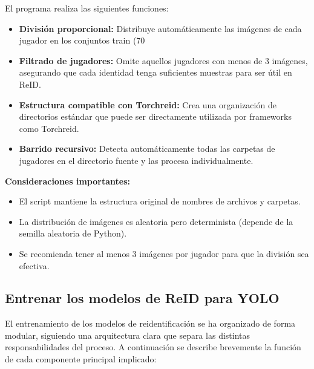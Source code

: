 \documentclass[12pt, a4paper, twoside]{article}
\begin{document}
	El programa realiza las siguientes funciones:
	
	\begin{itemize}
		\item \textbf{División proporcional:} Distribuye automáticamente las imágenes de cada jugador en los conjuntos train (70%
		\item \textbf{Filtrado de jugadores:} Omite aquellos jugadores con menos de 3 imágenes, asegurando que cada identidad tenga suficientes muestras para ser útil en ReID.
		\item \textbf{Estructura compatible con Torchreid:} Crea una organización de directorios estándar que puede ser directamente utilizada por frameworks como Torchreid.
		\item \textbf{Barrido recursivo:} Detecta automáticamente todas las carpetas de jugadores en el directorio fuente y las procesa individualmente.
	\end{itemize}
	
	\textbf{Consideraciones importantes:}
	\begin{itemize}
		\item El script mantiene la estructura original de nombres de archivos y carpetas.
		\item La distribución de imágenes es aleatoria pero determinista (depende de la semilla aleatoria de Python).
		\item Se recomienda tener al menos 3 imágenes por jugador para que la división sea efectiva.
	\end{itemize}
	
	
	
	\subsection{Entrenar los modelos de ReID para YOLO}
	
	El entrenamiento de los modelos de reidentificación se ha organizado de forma modular, siguiendo una arquitectura clara que separa las distintas responsabilidades del proceso. A continuación se describe brevemente la función de cada componente principal implicado:
	
\end{document}
